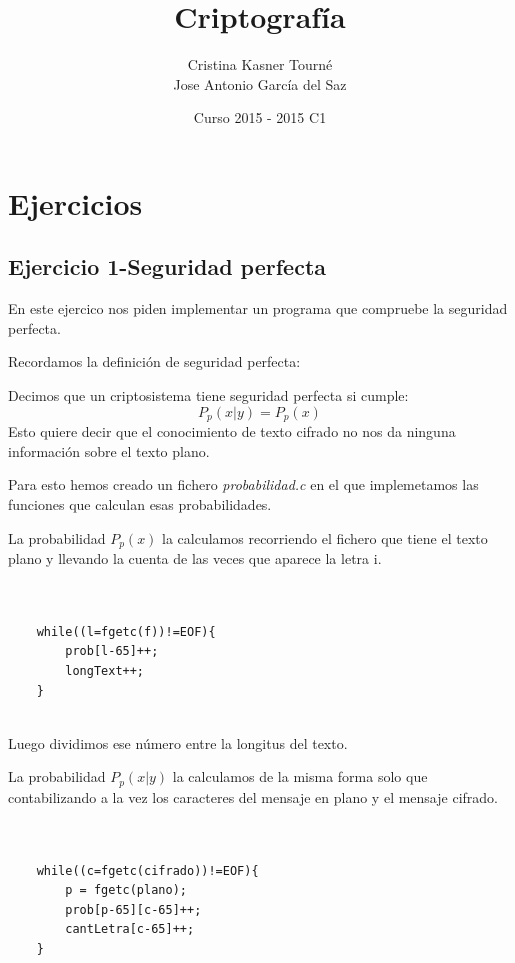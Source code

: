 \documentclass{apuntes}
\title{Criptografía}
\author{Cristina Kasner Tourné\\Jose Antonio García del Saz}
\date{Curso 2015 - 2015 C1}
\begin{document}
\pagestyle{plain}
\maketitle

\tableofcontents
\newpage
\chapter{Ejercicios}
\section{Ejercicio 1-Seguridad perfecta}

En este ejercico nos piden implementar un programa que compruebe la seguridad perfecta.

Recordamos la definición de seguridad perfecta:

\begin{defn}
	Decimos que un criptosistema tiene seguridad perfecta si cumple:
	$$P_p(x|y) = P_p(x)$$
	Esto quiere decir que el conocimiento de texto cifrado no nos da ninguna información sobre el texto plano.
\end{defn}

Para esto hemos creado un fichero \textit{probabilidad.c} en el que implemetamos las funciones que calculan esas probabilidades.

La probabilidad $P_p(x)$ la calculamos recorriendo el fichero que tiene el texto plano y llevando la cuenta de las veces que aparece la letra i. 

\lstset{language=C, breaklines=true, basicstyle=\footnotesize}
\begin{lstlisting}


	while((l=fgetc(f))!=EOF){
		prob[l-65]++;
		longText++;
	}


\end{lstlisting}


Luego dividimos ese número entre la longitus del texto.

La probabilidad $P_p(x|y)$ la calculamos de la misma forma solo que contabilizando a la vez los caracteres del mensaje en plano y el mensaje cifrado.

\begin{lstlisting}


	while((c=fgetc(cifrado))!=EOF){
		p = fgetc(plano);
		prob[p-65][c-65]++;
		cantLetra[c-65]++;
	}
	
\end{lstlisting}
\end{document}
